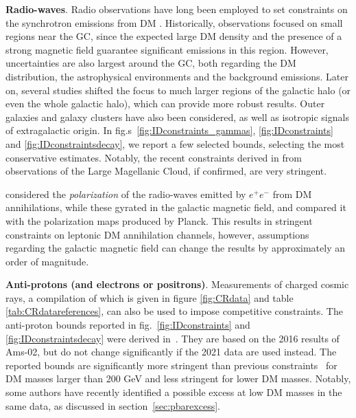 {\bf Radio-waves}. Radio observations have long been employed to set constraints on the synchrotron emissions from DM  \cite{DMradiobounds}. 
Historically, observations focused on small regions near the GC, since the expected large DM density and the presence of a strong magnetic field  
guarantee significant emissions  in this region.
However, uncertainties are also largest around the GC, both regarding the DM distribution, the astrophysical environments and the background emissions. 
Later on, several studies shifted the focus to much larger regions  of the galactic halo (or even the whole galactic halo), which can provide more robust results. 
Outer galaxies and galaxy clusters have also been considered, as well as isotropic signals of extragalactic origin. In fig.s~\ref{fig:IDconstraints_gammas}, \ref{fig:IDconstraints} and \ref{fig:IDconstraintsdecay}, we report a few selected bounds, selecting the most conservative estimates. 
Notably, the recent constraints derived in  \cite{DMradiobounds} from observations of the Large Magellanic Cloud, if confirmed, are very stringent. 

 \cite{DMradiobounds} considered the {\em polarization} of the radio-waves emitted by $e^+e^-$ from DM annihilations, while these gyrated in the galactic magnetic field, and compared it with the polarization maps produced by {\sc Planck}. 
This results in stringent constraints on leptonic DM annihilation channels, 
however, assumptions regarding the galactic magnetic field can change the results by approximately  an order of magnitude.


\smallskip

{\bf Anti-protons (and electrons or positrons)}. Measurements of charged cosmic rays, a compilation of which is given in figure \ref{fig:CRdata} and table \ref{tab:CRdatareferences}, can also be used to impose competitive constraints. 
The anti-proton bounds reported in fig.~\ref{fig:IDconstraints} and \ref{fig:IDconstraintsdecay} were derived in~\cite{Calore:2022stf}. 
They are based on the 2016 results of {\sc Ams-02}, but do not change significantly if the 2021 data are used instead. The reported bounds are significantly more stringent than previous constraints~\cite{Giesen:2015ufa} for DM masses larger than 200 GeV and less stringent for lower DM masses. Notably, some authors have recently identified a possible excess at low DM masses in the same data, as discussed in section~\ref{sec:pbarexcess}. 

